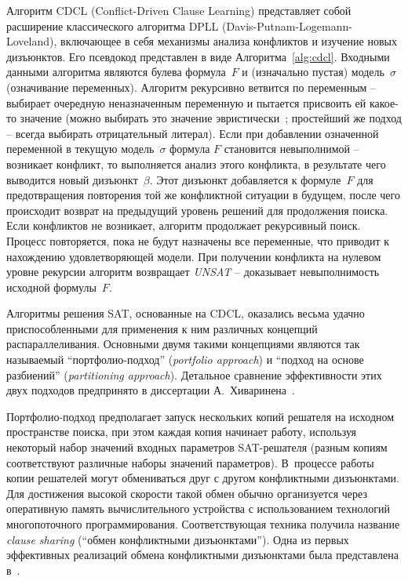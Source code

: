 Алгоритм CDCL (Conflict-Driven Clause Learning) представляет собой расширение классического алгоритма DPLL (Davis-Putnam-Logemann-Loveland), включающее в себя механизмы анализа конфликтов и изучение новых дизъюнктов.
Его псевдокод представлен в виде Алгоритма~\ref{alg:cdcl}.
Входными данными алгоритма являются булева формула~$F$ и (изначально пустая) модель~$\sigma$ (означивание переменных).
Алгоритм рекурсивно ветвится по переменным \--- выбирает очередную неназначенным переменную и пытается присвоить ей какое-то значение (можно выбирать это значение эвристически~\cite{moskewicz2001}; простейший же подход \--- всегда выбирать отрицательный литерал).
Если при добавлении означенной переменной в текущую модель~$\sigma$ формула $F$ становится невыполнимой \--- возникает конфликт, то выполняется анализ этого конфликта, в результате чего выводится новый дизъюнкт~$\beta$.
Этот дизъюнкт добавляется к формуле~$F$ для предотвращения повторения той же конфликтной ситуации в будущем, после чего происходит возврат на предыдущий уровень решений для продолжения поиска.
Если конфликтов не возникает, алгоритм продолжает рекурсивный поиск.
Процесс повторяется, пока не будут назначены все переменные, что приводит к нахождению удовлетворяющей модели.
При получении конфликта на нулевом уровне рекурсии алгоритм возвращает \textit{UNSAT} \--- доказывает невыполнимость исходной формулы~$F$.

Алгоритмы решения SAT, основанные на CDCL, оказались весьма удачно приспособленными для применения к ним различных концепций распараллеливания.
Основными двумя такими концепциями являются так называемый \enquote{портфолио-подход} (\textit{portfolio approach}) и \enquote{подход на основе разбиений} (\textit{partitioning approach}).
Детальное сравнение эффективности этих двух подходов предпринято в диссертации А.~Хиваринена~\cite{hyvarinen2011}.

Портфолио-подход предполагает запуск нескольких копий решателя на исходном пространстве поиска, при этом каждая копия начинает работу, используя некоторый набор значений входных параметров SAT-решателя (разным копиям соответствуют различные наборы значений параметров).
В~процессе работы копии решателей могут обмениваться друг с другом конфликтными дизъюнктами.
Для достижения высокой скорости такой обмен обычно организуется через оперативную память вычислительного устройства с использованием технологий многопоточного программирования.
Соответствующая техника получила название \textit{clause sharing} (\enquote{обмен конфликтными дизъюнктами}).
Одна из первых эффективных реализаций обмена конфликтными дизъюнктами была представлена в~\cite{hamadi2011}.

